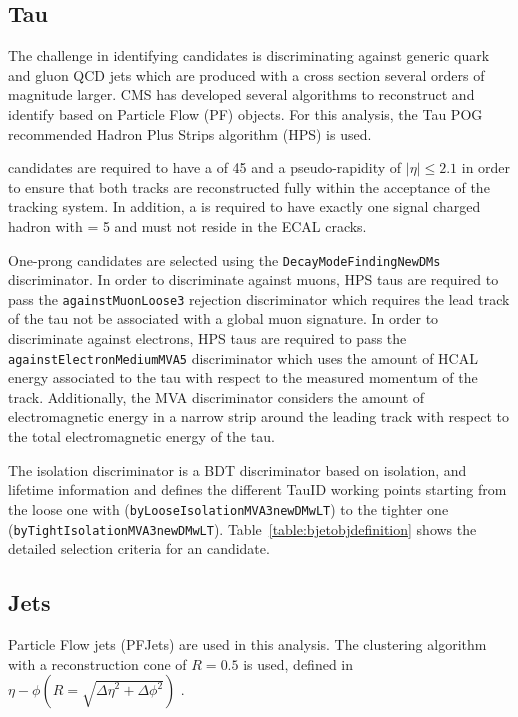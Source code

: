 \subsection{Tau}

The challenge in identifying \hadtau candidates is discriminating against generic quark and gluon QCD jets which are produced with a cross section several orders of magnitude larger. CMS has developed several algorithms to reconstruct and identify \hadtau based on Particle Flow (PF) objects. For this analysis, the Tau POG recommended Hadron Plus Strips algorithm (HPS) is used. 

\hadtau candidates are required to have a \pt of 45 \gev and a pseudo-rapidity of $|\eta| \le 2.1$ in order to ensure that both tracks are reconstructed fully within the acceptance of the tracking system. In addition, a \hadtau is required to have exactly one signal charged hadron with \pt = 5 \gev and must not reside in the ECAL cracks.

One-prong \hadtau candidates are selected using the \texttt{DecayModeFindingNewDMs} discriminator. In order to discriminate against muons, HPS taus are required to pass the \texttt{againstMuonLoose3} rejection discriminator which requires the lead track of the tau not be associated with a global muon signature. In order to discriminate against electrons, HPS taus are required to pass the \texttt{againstElectronMediumMVA5} discriminator which uses the amount of HCAL energy associated to the tau with respect to the measured momentum of the track. Additionally, the MVA discriminator considers the amount of electromagnetic energy in a narrow strip around the leading track with respect to the total electromagnetic energy of the tau. 

The isolation discriminator is a BDT \cite{Hocker:2007ht} discriminator based on isolation, \pt and \hadtau lifetime information and defines the different TauID working points starting from the loose one with (\texttt{byLooseIsolationMVA3newDMwLT}) to the tighter one (\texttt{byTightIsolationMVA3newDMwLT}). Table~\ref{table:bjetobjdefinition} shows the detailed selection criteria for an \hadtau candidate.

\subsection{Jets}

Particle Flow jets (PFJets) are used in this analysis. The \antikt clustering algorithm with a reconstruction cone of \ensuremath{R = 0.5} is used, defined in \ensuremath{\eta-\phi (R = \sqrt{{\Delta \eta}^2 + {\Delta \phi}^{2}})} \cite{1126-6708-2008-04-063}. 

